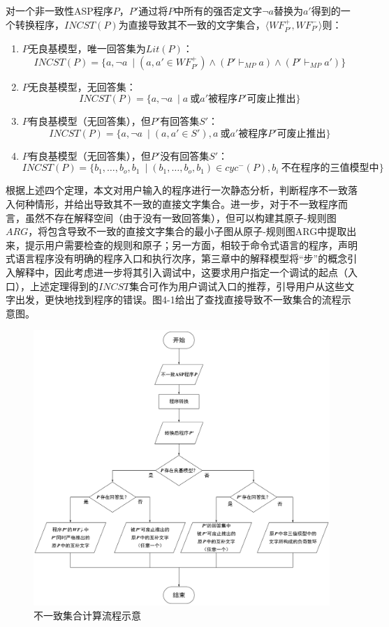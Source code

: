 \begin{theorem}
    \label{thm:incstlit}
    对一个非一致性ASP程序$P$，$P'$通过将$P$中所有的强否定文字$\lnot a$替换为$a'$得到的一个转换程序，$INCST(P)$为直接导致其不一致的文字集合，$\langle WF^+_{P'}, WF^-_{P'} \rangle$则：
    \begin{enumerate}[itemsep=0pt, label=(\arabic*)]
        \item $P$无良基模型，唯一回答集为$Lit(P)$：
        $$INCST(P)=\{a, \lnot a\ \mid (a, a' \in WF^+_{P'}) \land (P' \vdash_{MP} a) \land (P' \vdash_{MP} a')\}$$
        \item $P$无良基模型，无回答集：
        $$INCST(P)=\{a, \lnot a\ \mid a\ \text{或} a' \text{被程序} P' \text{可废止推出}\}$$
        \item $P$有良基模型（无回答集），但$P'$有回答集$S'$：
        $$INCST(P)=\{a, \lnot a\ \mid (a, a' \in S'), a\ \text{或} a' \text{被程序} P' \text{可废止推出}\}$$
        \item $P$有良基模型（无回答集），但$P'$没有回答集$S'$：
        $$INCST(P)=\{b_1, \ldots, b_o, b_1\ \mid (b_1, \ldots, b_o, b_1) \in cyc^-(P), b_i\ \text{不在程序的三值模型中}\}$$
    \end{enumerate}
\end{theorem}

根据上述四个定理，本文对用户输入的程序进行一次静态分析，判断程序不一致落入何种情形，并给出导致其不一致的直接文字集合。进一步，对于不一致程序而言，虽然不存在解释空间（由于没有一致回答集），但可以构建其原子-规则图$ARG$，将包含导致不一致的直接文字集合的最小子图从原子-规则图ARG中提取出来，提示用户需要检查的规则和原子；另一方面，相较于命令式语言的程序，声明式语言程序没有明确的程序入口和执行次序，第三章中的解释模型将“步”的概念引入解释中，因此考虑进一步将其引入调试中，这要求用户指定一个调试的起点（入口），上述定理得到的$INCST$集合可作为用户调试入口的推荐，引导用户从这些文字出发，更快地找到程序的错误。图4-1给出了查找直接导致不一致集合的流程示意图。
\begin{figure}[htbp]
    \centering
    \includegraphics[height=.8\textwidth, valign=c]{figures/不一致集合计算.jpg}
    \caption{不一致集合计算流程示意}
\end{figure}

